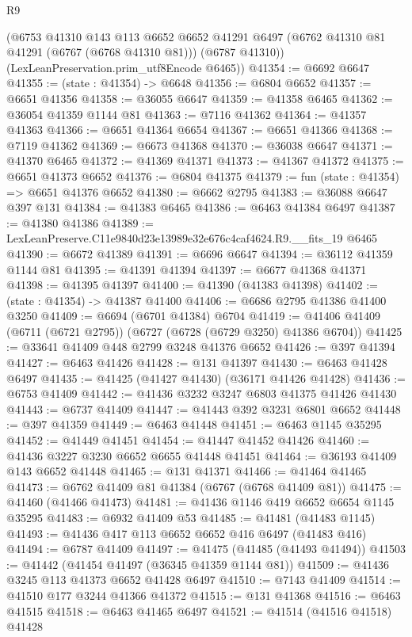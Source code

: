 \begin{lexlean}{R9}
\begin{coremodule}
      (@6753
        @41310
        @143
        @113
        @6652
        @6652
        @41291
        @6497
        (@6762 @41310 @81 @41291 (@6767 (@6768 @41310 @81)))
        (@6787 @41310))
      (LexLeanPreservation.prim_utf8Encode @6465))
@41354 := @6692 @6647
@41355 := (state : @41354) -> @6648
@41356 := @6804 @6652
@41357 := @6651 @41356
@41358 := @36055 @6647
@41359 := @41358 @6465
@41362 := @36054 @41359 @1144 @81
@41363 := @7116 @41362
@41364 := @41357 @41363
@41366 := @6651 @41364 @6654
@41367 := @6651 @41366
@41368 := @7119 @41362
@41369 := @6673 @41368
@41370 := @36038 @6647
@41371 := @41370 @6465
@41372 := @41369 @41371
@41373 := @41367 @41372
@41375 := @6651 @41373 @6652
@41376 := @6804 @41375
@41379 := fun (state : @41354) => @6651 @41376 @6652
@41380 := @6662 @2795
@41383 := @36088 @6647 @397 @131
@41384 := @41383 @6465
@41386 := @6463 @41384 @6497
@41387 := @41380 @41386
@41389 := LexLeanPreserve.C11e9840d23e13989e32e676c4caf4624.R9.__fits_19 @6465
@41390 := @6672 @41389
@41391 := @6696 @6647
@41394 := @36112 @41359 @1144 @81
@41395 := @41391 @41394
@41397 := @6677 @41368 @41371
@41398 := @41395 @41397
@41400 := @41390 (@41383 @41398)
@41402 := (state : @41354) -> @41387 @41400
@41406 := @6686 @2795 @41386 @41400 @3250
@41409 := @6694 (@6701 @41384) @6704
@41419 := @41406 @41409 (@6711 (@6721 @2795)) (@6727 (@6728 (@6729 @3250) @41386 @6704))
@41425 := @33641 @41409 @448 @2799 @3248 @41376 @6652
@41426 := @397 @41394
@41427 := @6463 @41426
@41428 := @131 @41397
@41430 := @6463 @41428 @6497
@41435 := @41425 (@41427 @41430) (@36171 @41426 @41428)
@41436 := @6753 @41409
@41442 := @41436 @3232 @3247 @6803 @41375 @41426 @41430
@41443 := @6737 @41409
@41447 := @41443 @392 @3231 @6801 @6652
@41448 := @397 @41359
@41449 := @6463 @41448
@41451 := @6463 @1145 @35295
@41452 := @41449 @41451
@41454 := @41447 @41452 @41426
@41460 := @41436 @3227 @3230 @6652 @6655 @41448 @41451
@41464 := @36193 @41409 @143 @6652 @41448
@41465 := @131 @41371
@41466 := @41464 @41465
@41473 := @6762 @41409 @81 @41384 (@6767 (@6768 @41409 @81))
@41475 := @41460 (@41466 @41473)
@41481 := @41436 @1146 @419 @6652 @6654 @1145 @35295
@41483 := @6932 @41409 @53
@41485 := @41481 (@41483 @1145)
@41493 := @41436 @417 @113 @6652 @6652 @416 @6497 (@41483 @416)
@41494 := @6787 @41409
@41497 := @41475 (@41485 (@41493 @41494))
@41503 := @41442 (@41454 @41497 (@36345 @41359 @1144 @81))
@41509 := @41436 @3245 @113 @41373 @6652 @41428 @6497
@41510 := @7143 @41409
@41514 := @41510 @177 @3244 @41366 @41372
@41515 := @131 @41368
@41516 := @6463 @41515
@41518 := @6463 @41465 @6497
@41521 := @41514 (@41516 @41518) @41428

\end{coremodule}
\end{lexlean}
